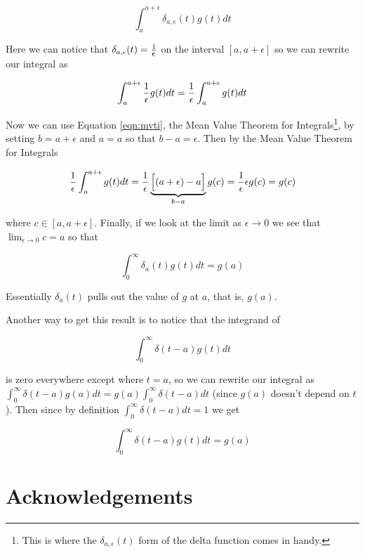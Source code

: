 \documentclass{article}
\begin{document}
\begin{equation*}
  \int_{a}^{a + \epsilon} \delta_{a,\epsilon}(t) g(t) dt
\end{equation*}

\bigskip
\noindent
Here we can notice that $ \delta_{a,\epsilon}(t) = \frac{1}{\mathlarger{\epsilon}}$ on the interval $[a, a+\epsilon]$ so we can rewrite our integral as 

\bigskip
\begin{equation*}
  \int_{a}^{a + \epsilon} \frac{1}{\mathlarger{\epsilon}} g(t) dt =  \frac{1}{\mathlarger{\epsilon}} \int_{a}^{a + \epsilon} g(t) dt
\end{equation*}

\bigskip
\noindent
Now we can use Equation \ref{eqn:mvti}, the Mean Value Theorem for Integrals\footnote{This is where the $\delta_{a,\epsilon}(t)$ form of the delta function comes in handy.},
by setting $b = a + \epsilon$ and $a = a$ so that $b - a = \epsilon$. Then by the Mean Value Theorem for Integrals


\bigskip
\begin{equation*}
 \frac{1}{\mathlarger{\epsilon}} \int_{a}^{a + \epsilon} g(t) dt =  \frac{1}{\mathlarger{\epsilon}} \underbrace{ \Big [(a + \epsilon) - a \Big]}_{b -a} g(c) = \frac{1}{\mathlarger{\epsilon}} \epsilon g(c) = g(c)
\end{equation*}

\bigskip
\noindent
where $c \in [a, a + \epsilon]$. Finally, if we look at the limit as $\epsilon \to 0$ we see that $\lim_{\epsilon \to 0} c = a$ so that 

\bigskip
\begin{equation}
  \int_{0}^{\infty} \delta_{a}(t) g(t) dt = g(a)
\end{equation}

\bigskip
\noindent
Essentially $\delta_{a}(t)$ pulls out the value of $g$ at $a$, that is, $g(a)$.

\bigskip
\noindent
Another way to get this result is to notice that the integrand of 

\bigskip
\begin{equation*}
  \int_{0}^{\infty} \delta (t-a) g(t) dt
\end{equation*}

\bigskip
\noindent
is zero everywhere except where $t = a$, so we can rewrite our integral as
 $\int_{0}^{\infty} \delta (t-a) g(a) dt = g(a) \int_{0}^{\infty} \delta (t-a) dt$ (since $g(a)$ doesn't depend on $t$). 
 Then since by definition $ \int_{0}^{\infty} \delta (t-a) dt = 1$ we get

\bigskip
\begin{equation*}
  \int_{0}^{\infty} \delta (t-a) g(t) dt = g(a)
\end{equation*}
\section*{Acknowledgements}

\newpage


\end{document}
